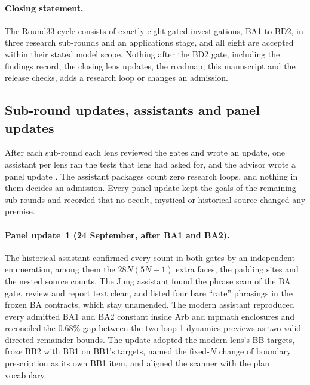 \paragraph{Closing statement.} The Round33 cycle consists of exactly eight
gated investigations, BA1 to BD2, in three research sub-rounds and an
applications stage, and all eight are accepted within their stated model
scope. Nothing after the BD2 gate, including the findings record, the closing
lens updates, the roadmap, this manuscript and the release checks, adds a
research loop or changes an admission.

\subsection{Sub-round updates, assistants and panel updates}
\label{sec:history-updates}
After each sub-round each lens reviewed the gates and wrote an update, one
assistant per lens ran the tests that lens had asked for, and the advisor
wrote a panel update \cite{r33panel,r33lenses}. The assistant packages count
zero research loops, and nothing in them decides an admission. Every panel
update kept the goals of the remaining sub-rounds and recorded that no
occult, mystical or historical source changed any premise.

\paragraph{Panel update~1 (24 September, after BA1 and BA2).} The historical
assistant confirmed every count in both gates by an independent enumeration,
among them the $28N(5N+1)$ extra faces, the padding sites and the nested
source counts. The Jung assistant found the phrase scan of the BA gate,
review and report text clean, and listed four bare ``rate'' phrasings in the
frozen BA contracts, which stay unamended. The modern assistant reproduced
every admitted BA1 and BA2 constant inside Arb and mpmath enclosures and
reconciled the $0.68\%$ gap between the two loop-1 dynamics previews as two
valid directed remainder bounds. The update adopted the modern lens's BB
targets, froze BB2 with BB1 on BB1's targets, named the fixed-$N$ change of
boundary prescription as its own BB1 item, and aligned the scanner with the
plan vocabulary.

